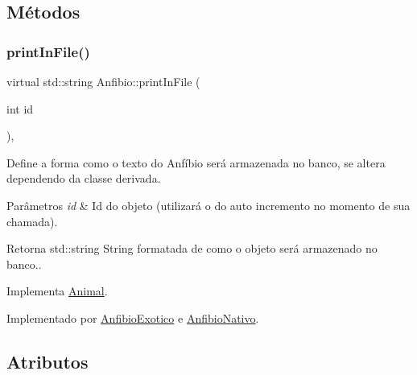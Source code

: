 \subsection{Métodos}
\mbox{\label{classAnfibio_ab866ca21fb00c2d4d571aadd271eadec}} 
\subsubsection{\texorpdfstring{print\+In\+File()}{printInFile()}}
{\footnotesize\ttfamily virtual std\+::string Anfibio\+::print\+In\+File (\begin{DoxyParamCaption}\item[{int}]{id }\end{DoxyParamCaption})\hspace{0.3cm}{\ttfamily [protected]}, {}}



Define a forma como o texto do Anfíbio será armazenada no banco, se altera dependendo da classe derivada. 


\begin{DoxyParams}{Parâmetros}
{\em id} & Id do objeto (utilizará o do auto incremento no momento de sua chamada). \\
\hline
\end{DoxyParams}
\begin{DoxyReturn}{Retorna}
std\+::string String formatada de como o objeto será armazenado no banco.. 
\end{DoxyReturn}


Implementa \hyperlink{classAnimal_ac75406040726a6339932d70164cc7242}{Animal}.



Implementado por \hyperlink{classAnfibioExotico_a08d9debec54258a0f43c8c503dfb23d0}{Anfibio\+Exotico} e \hyperlink{classAnfibioNativo_a7926e1af44542ee268e27dd3d862f583}{Anfibio\+Nativo}.



\subsection{Atributos}
\mbox{\label{classAnfibio_a994200134b0d314e3db0ac5c781bb7e7}} 
